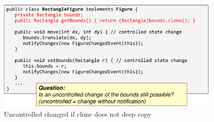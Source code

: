\begin{figure}[H]
  \centering
  \includegraphics[width=1.0\columnwidth]{figures/uncontrolledChange.png}
  \caption{Uncontrolled changed if clone does not deep copy}
  \label{fig:deepCopy}
\end{figure}
